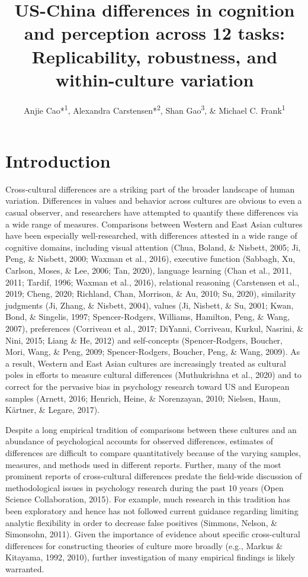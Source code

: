 \documentclass[
  man,floatsintext]{apa6}
\title{US-China differences in cognition and perception across 12 tasks: Replicability, robustness, and within-culture variation}
\author{Anjie Cao*\textsuperscript{1}, Alexandra Carstensen*\textsuperscript{2}, Shan Gao\textsuperscript{3}, \& Michael C. Frank\textsuperscript{1}}
\date{}
\affiliation{\vspace{0.5cm}\textsuperscript{1} Department of Psychology, Stanford University\\\textsuperscript{2} Department of Psychology, University of California, San Diego\\\textsuperscript{3} Department of Psychology, University of Chicago}
\begin{document}
\maketitle

\hypertarget{introduction}{%
\section{Introduction}\label{introduction}}

Cross-cultural differences are a striking part of the broader landscape of human variation. Differences in values and behavior across cultures are obvious to even a casual observer, and researchers have attempted to quantify these differences via a wide range of measures. Comparisons between Western and East Asian cultures have been especially well-researched, with differences attested in a wide range of cognitive domains, including visual attention (Chua, Boland, \& Nisbett, 2005; Ji, Peng, \& Nisbett, 2000; Waxman et al., 2016), executive function (Sabbagh, Xu, Carlson, Moses, \& Lee, 2006; Tan, 2020), language learning (Chan et al., 2011, 2011; Tardif, 1996; Waxman et al., 2016), relational reasoning (Carstensen et al., 2019; Cheng, 2020; Richland, Chan, Morrison, \& Au, 2010; Su, 2020), similarity judgments (Ji, Zhang, \& Nisbett, 2004), values (Ji, Nisbett, \& Su, 2001; Kwan, Bond, \& Singelis, 1997; Spencer-Rodgers, Williams, Hamilton, Peng, \& Wang, 2007), preferences (Corriveau et al., 2017; DiYanni, Corriveau, Kurkul, Nasrini, \& Nini, 2015; Liang \& He, 2012) and self-concepts (Spencer-Rodgers, Boucher, Mori, Wang, \& Peng, 2009; Spencer-Rodgers, Boucher, Peng, \& Wang, 2009). As a result, Western and East Asian cultures are increasingly treated as cultural poles in efforts to measure cultural differences (Muthukrishna et al., 2020) and to correct for the pervasive bias in psychology research toward US and European samples (Arnett, 2016; Henrich, Heine, \& Norenzayan, 2010; Nielsen, Haun, Kärtner, \& Legare, 2017).

Despite a long empirical tradition of comparisons between these cultures and an abundance of psychological accounts for observed differences, estimates of differences are difficult to compare quantitatively because of the varying samples, measures, and methods used in different reports. Further, many of the most prominent reports of cross-cultural differences predate the field-wide discussion of methodological issues in psychology research during the past 10 years (Open Science Collaboration, 2015). For example, much research in this tradition has been exploratory and hence has not followed current guidance regarding limiting analytic flexibility in order to decrease false positives (Simmons, Nelson, \& Simonsohn, 2011). Given the importance of evidence about specific cross-cultural differences for constructing theories of culture more broadly (e.g., Markus \& Kitayama, 1992, 2010), further investigation of many empirical findings is likely warranted.
\end{document}
